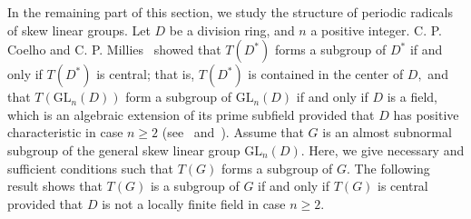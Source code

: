 \documentclass{amsart}
\theoremstyle{definition}
\begin{document}
In the remaining part of this section, we study the structure of periodic radicals of skew linear groups. Let $D$ be a division ring, and $n$ a positive integer. C. P. Coelho and C. P. Millies~\cite[Proposition 3.1]{Pa_CoeMil_1998} showed that $T(D^*)$ forms a subgroup of $D^*$ if and only if $T(D^*)$ is central; that is, $T(D^*)$ is contained in the center of $D,$ and that $T(\mathrm{GL}_n(D))$ form a subgroup of $\mathrm{GL}_n(D)$ if and only if $D$ is a field, which is an algebraic extension of its prime subfield provided that $D$ has positive characteristic in case $n\geq 2$ (see~\cite[Proposition 3.3]{Pa_CoeMil_1998} and~\cite[Proposition 2.2]{Pa_Milies_1981}). Assume that $G$ is an almost subnormal subgroup of the  general skew linear group $\mathrm{GL}_n(D).$ Here, we give necessary and sufficient conditions such that $T(G)$ forms a subgroup of $G.$ The following result shows that $T(G)$ is a subgroup of $G$ if and only if $T(G)$ is central provided that $D$ is not a locally finite field in case $n\geq 2.$
\end{document}
